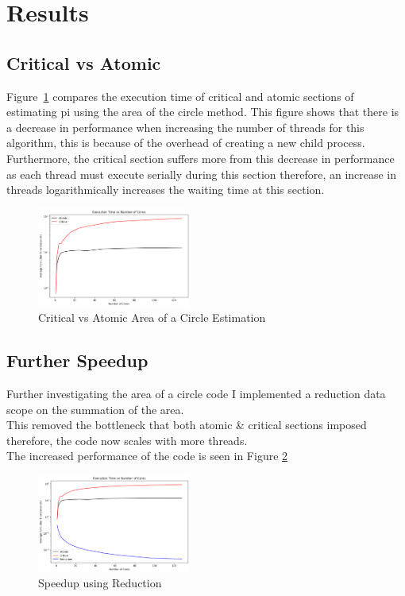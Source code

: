 \documentclass[conference]{IEEEtran}
\begin{document}
\section{Results}
\subsection{Critical vs Atomic}
Figure~\ref{fig:critical_atomic} compares the execution time of critical and atomic sections of estimating pi using the area of the circle method.
This figure shows that there is a decrease in performance when increasing the number of threads for this algorithm, this is because of the overhead of creating a new child process.
Furthermore, the critical section suffers more from this decrease in performance as each thread must execute serially during this section therefore, an increase in threads logarithmically increases the waiting time at this section.

\begin{figure}[H]
    \centering
    \includegraphics[width=0.45\textwidth]{../img/atomic_vs_critical.png}
    \caption{Critical vs Atomic Area of a Circle Estimation}
    \label{fig:critical_atomic}
\end{figure}

\subsection{Further Speedup}
Further investigating the area of a circle code I implemented a reduction data scope on the summation of the area. \\
This removed the bottleneck that both atomic \& critical sections imposed therefore, the code now scales with more threads. \\
The increased performance of the code is seen in Figure \ref{fig:speedup} 

\begin{figure}[H]
    \centering
    \includegraphics[width=0.45\textwidth]{../img/optimised.png}
    \caption{Speedup using Reduction}
    \label{fig:speedup}
\end{figure}
\end{document}
